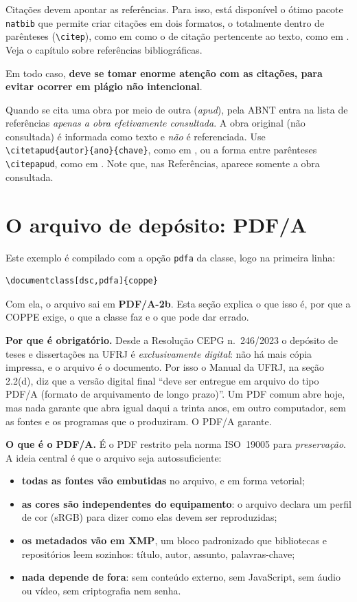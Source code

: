 \documentclass[dsc,pdfa]{coppe}
\begin{document}
  Citações devem apontar as referências. Para isso, está disponível o ótimo pacote \verb*|natbib| que permite criar citações em dois formatos, o totalmente dentro de parênteses (\verb*|\citep|), como em \citep{article-example} como o de citação pertencente ao texto, como em \citet{article-example}. Veja o capítulo sobre referências bibliográficas.

  Em todo caso, \textbf{deve se tomar enorme atenção com as citações, para evitar ocorrer em plágio não intencional}.

  Quando se cita uma obra por meio de outra (\textit{apud}), pela ABNT entra na lista de referências \emph{apenas a obra efetivamente consultada}. A obra original (não consultada) é informada como texto e \emph{não} é referenciada. Use \verb*|\citetapud{autor}{ano}{chave}|, como em , ou a forma entre parênteses \verb*|\citepapud|, como em . Note que, nas Referências, aparece somente a obra consultada.

\section{O arquivo de depósito: PDF/A}
\label{sec:pdfa}

Este exemplo é compilado com a opção \verb|pdfa| da classe, logo na primeira linha:
\begin{verbatim}
\documentclass[dsc,pdfa]{coppe}
\end{verbatim}
Com ela, o arquivo sai em \textbf{PDF/A-2b}. Esta seção explica o que isso é, por que a COPPE exige, o que a classe faz e o que pode dar errado.

\textbf{Por que é obrigatório.} Desde a Resolução CEPG n.~246/2023 o depósito de teses e dissertações na UFRJ é \emph{exclusivamente digital}: não há mais cópia impressa, e o arquivo é o documento. Por isso o Manual da UFRJ, na seção 2.2(d), diz que a versão digital final ``deve ser entregue em arquivo do tipo PDF/A (formato de arquivamento de longo prazo)''. Um PDF comum abre hoje, mas nada garante que abra igual daqui a trinta anos, em outro computador, sem as fontes e os programas que o produziram. O PDF/A garante.

\textbf{O que é o PDF/A.} É o PDF restrito pela norma ISO~19005 para \emph{preservação}. A ideia central é que o arquivo seja autossuficiente:
\begin{itemize}
  \item \textbf{todas as fontes vão embutidas} no arquivo, e em forma vetorial;
  \item \textbf{as cores são independentes do equipamento}: o arquivo declara um perfil de cor (sRGB) para dizer como elas devem ser reproduzidas;
  \item \textbf{os metadados vão em XMP}, um bloco padronizado que bibliotecas e repositórios leem sozinhos: título, autor, assunto, palavras-chave;
  \item \textbf{nada depende de fora}: sem conteúdo externo, sem JavaScript, sem áudio ou vídeo, sem criptografia nem senha.
\end{itemize}
\end{document}

